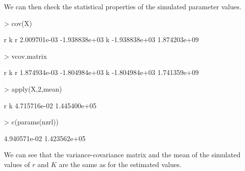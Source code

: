 \documentclass[a4paper]{article}
\begin{document}
We can then check the statistical properties of the simulated parameter values.
\begin{center}
\begin{minipage}[H]{0.95\textwidth}%
\begin{shaded}%
\begin{Schunk}
\begin{Sinput}
> cov(X)
\end{Sinput}
\begin{Soutput}
              r             k
r  2.009701e-03 -1.938838e+03
k -1.938838e+03  1.874203e+09
\end{Soutput}
\begin{Sinput}
> vcov.matrix
\end{Sinput}
\begin{Soutput}
              r             k
r  1.874934e-03 -1.804984e+03
k -1.804984e+03  1.741359e+09
\end{Soutput}
\begin{Sinput}
> apply(X,2,mean)
\end{Sinput}
\begin{Soutput}
           r            k 
4.715716e-02 1.445400e+05 
\end{Soutput}
\begin{Sinput}
> c(params(nzrl))
\end{Sinput}
\begin{Soutput}
[1] 4.940571e-02 1.423562e+05
\end{Soutput}
\end{Schunk}
\end{shaded}%
\end{minipage}
\end{center}

We can see that the variance-covariance matrix and the mean of the simulated values of $r$ and $K$ are the same as for the estimated values.


\end{document}

